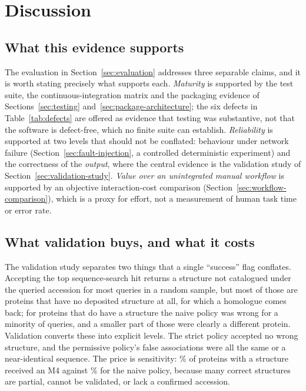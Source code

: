 \section{Discussion}
\label{sec:discussion}

\subsection{What this evidence supports}

The evaluation in Section~\ref{sec:evaluation} addresses three separable claims,
and it is worth stating precisely what supports each. \emph{Maturity} is
supported by the test suite, the continuous-integration matrix and the packaging
evidence of Sections~\ref{sec:testing} and~\ref{sec:package-architecture}; the six
defects in Table~\ref{tab:defects} are offered as evidence that testing was
substantive, not that the software is defect-free, which no finite suite can
establish. \emph{Reliability} is supported at two levels that should not be
conflated: behaviour under network failure (Section~\ref{sec:fault-injection}, a
controlled deterministic experiment) and the correctness of the \emph{output},
where the central evidence is the validation study of
Section~\ref{sec:validation-study}. \emph{Value over an unintegrated manual
workflow} is supported by an objective interaction-cost comparison
(Section~\ref{sec:workflow-comparison}), which is a proxy for effort, not a
measurement of human task time or error rate.

\subsection{What validation buys, and what it costs}

The validation study separates two things that a single ``success'' flag
conflates. Accepting the top sequence-search hit returns a structure not
catalogued under the queried accession for most queries in a random sample, but
most of those are proteins that have no deposited structure at all, for which a
homologue comes back; for proteins that do have a structure the naive policy was
wrong for a minority of queries, and a smaller part of those were clearly a
different protein. Validation converts these into explicit levels. The strict
policy accepted no wrong structure, and the permissive policy's false
associations were all the same or a near-identical sequence. The price is
sensitivity: \% of proteins with a structure received an M4 against
\% for the naive policy, because many correct structures are partial,
cannot be validated, or lack a confirmed accession.

